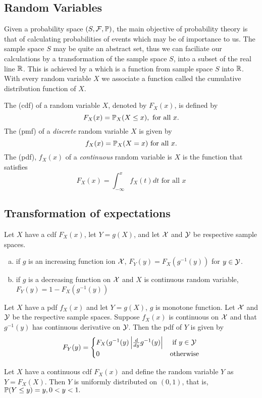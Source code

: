 \subsection{Random Variables}
Given a probability space $(S, \mathcal F, \mathbb P)$, the main objective of probability theory is that of calculating probabilities of events which may be of importance to us. The sample space $S$ may be quite an abstract set, thus we can faciliate our calculations by a transformation of the sample space $S$, into a subset of the real line $\mathbb R$. This is achieved by a  which is a function from sample space $S$ into $\mathbb R$.
With every random variable $X$ we associate a function called the cumulative distribution function of $X$.


\begin{definition}
    The  (cdf) of a random variable $X$, denoted by $F_{X}(x)$, is defined by 
    $$
    F_X(x) = \mathbb P_X(X\leq x), \text{ for all } x.
    $$
    The  (pmf) of a \textit{discrete} random variable $X$ is given by
    $$
    f_X(x) = \mathbb P_X(X=x) \text{ for all } x.
    $$
    The  (pdf), $f_X(x)$ of a \textit{continuous} random variable is $X$ is the function that satisfies
    $$
    F_X(x) = \int_{-\infty}^{x}f_X(t)dt \text{ for all } x
    $$
\end{definition}

\subsection{Transformation of expectations}
\begin{theorem}
    Let $X$ have a cdf $F_X(x)$, let $Y=g(X)$, and let $\mathcal X$ and $\mathcal Y$ be respective sample spaces.
    \begin{enumerate}[(a)]
        \item if $g$ is an increasing function ion $\mathcal X$, $F_Y(y) = F_X(g^{-1}(y))$ for $y \in \mathcal Y$.
        \item if $g$ is a decreasing function on $\mathcal X$ and $X$ is continuous random variable, $F_Y(y) = 1-F_X(g^{-1}(y))$
    \end{enumerate}
\end{theorem}

\begin{theorem}
    Let $X$ have a pdf $f_X(x)$ and let $Y = g(X)$, $g$ is monotone function. Let $\mathcal X$ and $\mathcal Y$ be the respective sample spaces. Suppose $f_X(x)$ is continuous on $\mathcal X$ and that $g^{-1}(y)$ has continuous derivative on $\mathcal Y$. Then the pdf of $Y$ is given by 
    $$
    F_Y(y) = 
    \begin{cases}
    F_X(g^{-1}(y) \left\lvert \frac{d}{dy}g^{-1}(y) \right\rvert & \text{ if } y \in \mathcal Y \\
    0 & \text{otherwise}
    \end{cases}
    $$
\end{theorem}

\begin{theorem}
    Let $X$ have a continuous cdf $F_X(x)$ and define the random variable $Y$ as $Y = F_X(X)$. Then $Y$ is uniformly distributed on $(0,1)$, that is, $\mathbb P(Y \leq y) = y, 0<y<1.$
\end{theorem}